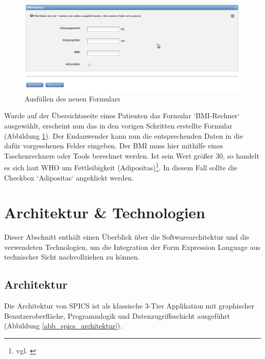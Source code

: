 \begin{figure}[h]
\begin{center}
\includegraphics[scale=0.5]{figures/workflow_formular_ausfuellen}
\caption{Ausfüllen des neuen Formulars}

\label{abb_workflow_formular_ausfuellen}
\end{center}
\end{figure}

Wurde auf der Übersichtsseite eines Patienten das Formular `BMI-Rechner` ausgewählt, erscheint nun das in den vorigen Schritten erstellte Formular (Abbildung \ref{abb_workflow_formular_ausfuellen}). Der Endanwender kann nun die ent\-sprech\-enden Daten in die dafür vorgesehenen Felder eingeben. Der BMI muss hier mithilfe eines Taschenrechners oder Tools berechnet werden. Ist sein Wert größer 30, so handelt es sich laut WHO um Fettleibigkeit (Adipositas)\footnote{ vgl. \cite{Who00} }. In diesem Fall sollte die Checkbox `Adipositas` angeklickt werden.



\section{Architektur \& Technologien}

Dieser Abschnitt enthält einen Überblick über die Softwarearchitektur und die verwendeten Technologien, um die Integration der Form Expression Language aus technischer Sicht nachvollziehen zu können.


\subsection{Architektur}

Die Architektur von SPICS ist als klassische 3-Tier Applikation mit graphischer Benutzeroberfläche, Programmlogik und Datenzugriffsschicht ausgeführt (Abbildung \ref{abb_spics_architektur}). 

